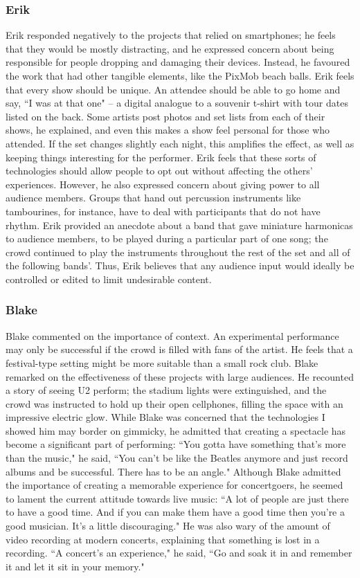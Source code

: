 \subsubsection{Erik}
Erik responded negatively to the projects that relied on smartphones; he feels that they would be mostly distracting, and he expressed concern about being responsible for people dropping and damaging their devices. Instead, he favoured the work that had other tangible elements, like the PixMob beach balls. Erik feels that every show should be unique. An attendee should be able to go home and say, ``I was at that one" -- a digital analogue to a souvenir t-shirt with tour dates listed on the back. Some artists post photos and set lists from each of their shows, he explained, and even this makes a show feel personal for those who attended. If the set changes slightly each night, this amplifies the effect, as well as keeping things interesting for the performer. Erik feels that these sorts of technologies should allow people to opt out without affecting the others' experiences. However, he also expressed concern about giving power to all audience members. Groups that hand out percussion instruments like tambourines, for instance, have to deal with participants that do not have rhythm. Erik provided an anecdote about a band that gave miniature harmonicas to audience members, to be played during a particular part of one song; the crowd continued to play the instruments throughout the rest of the set and all of the following bands'. Thus, Erik believes that any audience input would ideally be controlled or edited to limit undesirable content.

\subsubsection{Blake}
Blake commented on the importance of context. An experimental performance may only be successful if the crowd is filled with fans of the artist. He feels that a festival-type setting might be more suitable than a small rock club. Blake remarked on the effectiveness of these projects with large audiences. He recounted a story of seeing U2 perform; the stadium lights were extinguished, and the crowd was instructed to hold up their open cellphones, filling the space with an impressive electric glow. While Blake was concerned that the technologies I showed him may border on gimmicky, he admitted that creating a spectacle has become a significant part of performing: ``You gotta have something that's more than the music," he said, ``You can't be like the Beatles anymore and just record albums and be successful. There has to be an angle." Although Blake admitted the importance of creating a memorable experience for concertgoers, he seemed to lament the current attitude towards live music: ``A lot of people are just there to have a good time. And if you can make them have a good time then you're a good musician. It's a little discouraging." He was also wary of the amount of video recording at modern concerts, explaining that something is lost in a recording. ``A concert's an experience," he said, ``Go and soak it in and remember it and let it sit in your memory."


